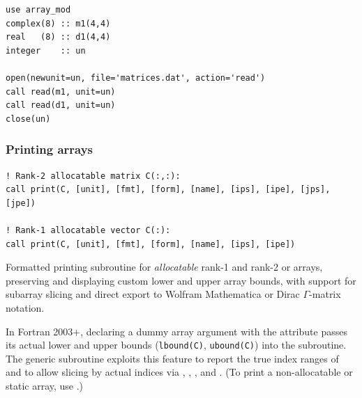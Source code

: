 \begin{description}[leftmargin=2.2cm, style=nextline]
\end{description}

\lstset{language=[95]Fortran}
\begin{lstlisting}
use array_mod
complex(8) :: m1(4,4)
real   (8) :: d1(4,4)
integer    :: un

open(newunit=un, file='matrices.dat', action='read')
call read(m1, unit=un)
call read(d1, unit=un)
close(un)
\end{lstlisting}

\subsubsection{Printing arrays}
\label{subsubsec:printing_arrays}


\lstset{language=[95]Fortran}
\begin{lstlisting}
! Rank-2 allocatable matrix C(:,:):
call print(C, [unit], [fmt], [form], [name], [ips], [ipe], [jps], [jpe])

! Rank-1 allocatable vector C(:):
call print(C, [unit], [fmt], [form], [name], [ips], [ipe])
\end{lstlisting}

Formatted printing subroutine for \emph{allocatable} rank-1 and rank-2  or  arrays, preserving and displaying custom lower and upper array bounds, with support for subarray slicing and direct export to Wolfram Mathematica or Dirac $\Gamma$-matrix notation.

In Fortran 2003+, declaring a dummy array argument with the  attribute passes its actual lower and upper bounds (\texttt{lbound(C)}, \texttt{ubound(C)}) into the subroutine. The generic subroutine  exploits this feature to report the true index ranges of  and to allow slicing by actual indices via , , , and . (To print a non-allocatable or static array, use .)

